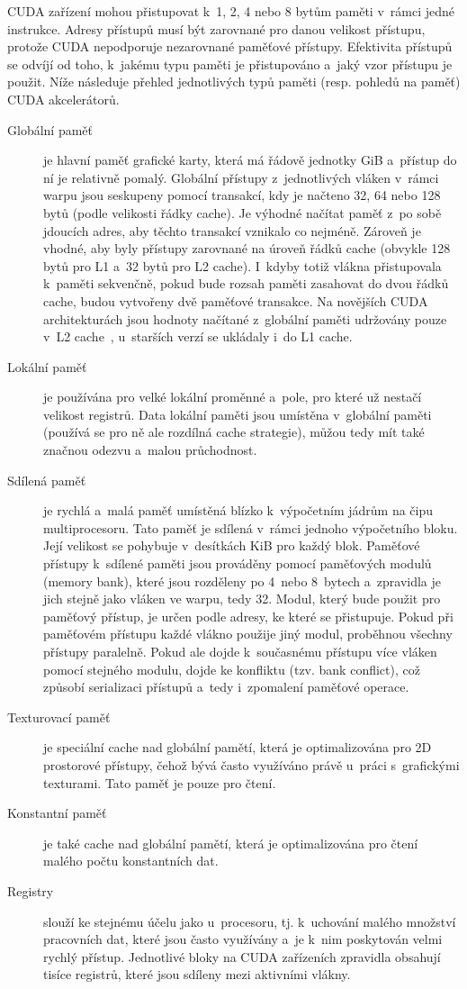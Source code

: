 CUDA zařízení mohou přistupovat k~1, 2, 4 nebo 8 bytům paměti v~rámci jedné instrukce. Adresy přístupů musí být zarovnané pro danou velikost přístupu, protože CUDA nepodporuje nezarovnané paměťové přístupy. Efektivita přístupů se odvíjí od toho, k~jakému typu paměti je přistupováno a~jaký vzor přístupu je použit. Níže následuje přehled jednotlivých typů paměti (resp. pohledů na paměť) CUDA akcelerátorů.
\begin{description}
    \item[Globální paměť] je hlavní paměť grafické karty, která má řádově jednotky GiB a~přístup do ní je relativně pomalý. Globální přístupy z~jednotlivých vláken v~rámci warpu jsou seskupeny pomocí transakcí, kdy je načteno 32, 64 nebo 128 bytů (podle velikosti řádky cache). Je výhodné načítat paměť z~po sobě jdoucích adres, aby těchto transakcí vznikalo co nejméně. Zároveň je vhodné, aby byly přístupy zarovnané na úroveň řádků cache (obvykle 128 bytů pro L1 a~32 bytů pro L2 cache). I~kdyby totiž vlákna přistupovala k~paměti sekvenčně, pokud bude rozsah paměti zasahovat do dvou řádků cache, budou vytvořeny dvě paměťové transakce. Na novějších CUDA architekturách jsou hodnoty načítané z~globální paměti udržovány pouze v~L2 cache~\cite{cudacguide}, u~starších verzí se ukládaly i~do L1 cache.
    \item[Lokální paměť] je používána pro velké lokální proměnné a~pole, pro které už nestačí velikost registrů. Data lokální paměti jsou umístěna v~globální paměti (používá se pro ně ale rozdílná cache strategie), můžou tedy mít také značnou odezvu a~malou průchodnost.
    \item[Sdílená paměť] je rychlá a~malá paměť umístěná blízko k~výpočetním jádrům na čipu multiprocesoru. Tato paměť je sdílená v~rámci jednoho výpočetního bloku. Její velikost se pohybuje v~desítkách KiB pro každý blok. Paměťové přístupy k~sdílené paměti jsou prováděny pomocí paměťových modulů (memory bank), které jsou rozděleny po 4~nebo 8~bytech a~zpravidla je jich stejně jako vláken ve warpu, tedy 32. Modul, který bude použit pro paměťový přístup, je určen podle adresy, ke které se přistupuje. Pokud při paměťovém přístupu každé vlákno použije jiný modul, proběhnou všechny přístupy paralelně. Pokud ale dojde k~současnému přístupu více vláken pomocí stejného modulu, dojde ke konfliktu (tzv. bank conflict), což způsobí serializaci přístupů a~tedy i~zpomalení paměťové operace.
    \item[Texturovací paměť] je speciální cache nad globální pamětí, která je optimalizována pro 2D prostorové přístupy, čehož bývá často využíváno právě u~práci s~grafickými texturami. Tato paměť je pouze pro čtení.
    \item[Konstantní paměť] je také cache nad globální pamětí, která je optimalizována pro čtení malého počtu konstantních dat.
    \item[Registry] slouží ke stejnému účelu jako u~procesoru, tj. k~uchování malého množství pracovních dat, které jsou často využívány a~je k~nim poskytován velmi rychlý přístup. Jednotlivé bloky na CUDA zařízeních zpravidla obsahují tisíce registrů, které jsou sdíleny mezi aktivními vlákny.
\end{description}

